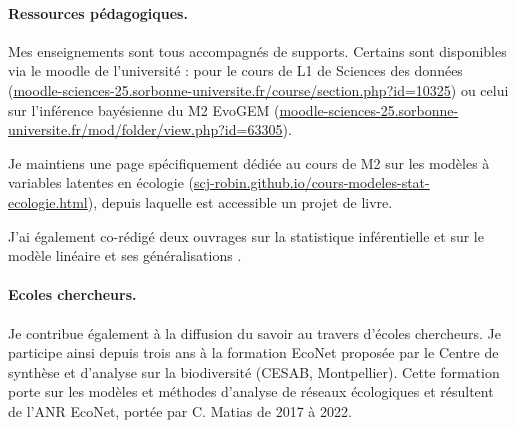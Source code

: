 \paragraph{Ressources pédagogiques.}
Mes enseignements sont tous accompagnés de supports. Certains sont disponibles via le moodle de l’université : pour le cours de L1 de Sciences des données (\url{moodle-sciences-25.sorbonne-universite.fr/course/section.php?id=10325}) ou celui sur l’inférence bayésienne du M2 EvoGEM (\url{moodle-sciences-25.sorbonne-universite.fr/mod/folder/view.php?id=63305}). 

Je maintiens une page spécifiquement dédiée au cours de M2 sur les modèles à variables latentes en écologie (\url{scj-robin.github.io/cours-modeles-stat-ecologie.html}), depuis laquelle est accessible un projet de livre.

J’ai également co-rédigé deux ouvrages sur la statistique inférentielle \cite{DRV99} et sur le modèle linéaire et ses généralisations \cite{DBE15}.

\paragraph{Ecoles chercheurs.}
Je contribue également à la diffusion du savoir au travers d’écoles chercheurs. Je participe ainsi depuis trois ans à la formation EcoNet proposée par le Centre de synthèse et d’analyse sur la biodiversité (CESAB, Montpellier). Cette formation porte sur les modèles et méthodes d’analyse de réseaux écologiques et résultent de l’ANR EcoNet, portée par C. Matias de 2017 à 2022.



